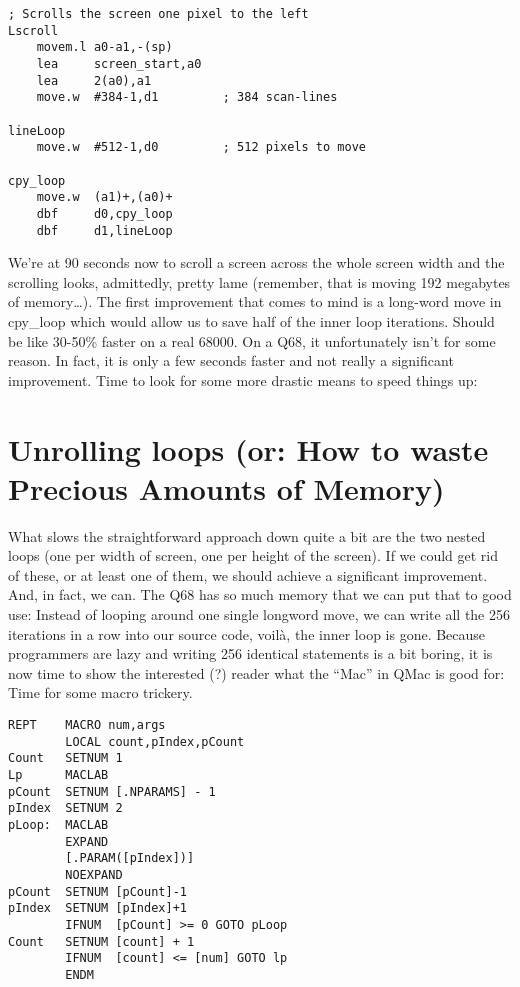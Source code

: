 \begin{lstlisting}[firstnumber=1,caption={Scrolling one pixel leftwards}]
; Scrolls the screen one pixel to the left
Lscroll
    movem.l a0-a1,-(sp)
    lea     screen_start,a0
    lea     2(a0),a1
    move.w  #384-1,d1         ; 384 scan-lines

lineLoop
    move.w  #512-1,d0         ; 512 pixels to move
    
cpy_loop
    move.w  (a1)+,(a0)+
    dbf     d0,cpy_loop
    dbf     d1,lineLoop
\end{lstlisting}

We're at 90 seconds now to scroll a screen across the whole screen width
and the scrolling looks, admittedly, pretty lame (remember, that is
moving 192 megabytes of memory\ldots{}). The first improvement that
comes to mind is a long-word move in cpy\_loop which would allow us to
save half of the inner loop iterations. Should be like 30-50\% faster on
a real 68000. On a Q68, it unfortunately isn't for some reason. In fact,
it is only a few seconds faster and not really a significant
improvement. Time to look for some more drastic means to speed things
up:

\section{Unrolling loops (or: How to waste Precious Amounts of Memory)}

What slows the straightforward approach down quite a bit are the two
nested loops (one per width of screen, one per height of the screen). If
we could get rid of these, or at least one of them, we should achieve a
significant improvement. And, in fact, we can. The Q68 has so much
memory that we can put that to good use: Instead of looping around one
single longword move, we can write all the 256 iterations in a row into
our source code, voilà, the inner loop is gone. Because programmers are
lazy and writing 256 identical statements is a bit boring, it is now
time to show the interested (?) reader what the ``Mac'' in QMac is good
for: Time for some macro trickery.

\begin{lstlisting}[firstnumber=1,caption={The REPT Macro}]
REPT    MACRO num,args
        LOCAL count,pIndex,pCount
Count   SETNUM 1
Lp      MACLAB
pCount  SETNUM [.NPARAMS] - 1
pIndex  SETNUM 2
pLoop:  MACLAB
        EXPAND
        [.PARAM([pIndex])]
        NOEXPAND
pCount  SETNUM [pCount]-1
pIndex  SETNUM [pIndex]+1
        IFNUM  [pCount] >= 0 GOTO pLoop
Count   SETNUM [count] + 1
        IFNUM  [count] <= [num] GOTO lp
        ENDM
\end{lstlisting}


